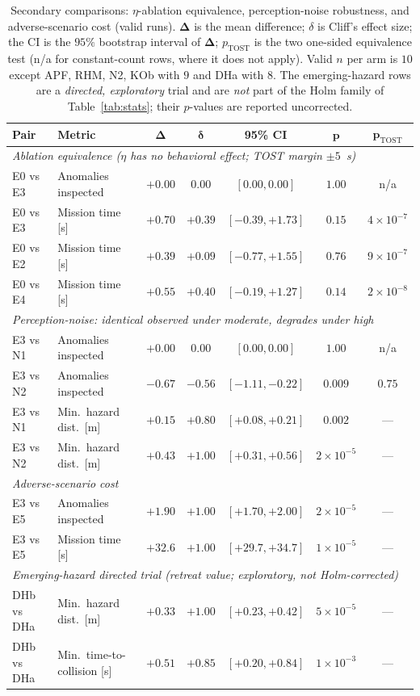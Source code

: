\begin{table}[t]
\centering
\caption{Secondary comparisons: $\eta$-ablation equivalence, perception-noise
robustness, and adverse-scenario cost (valid runs). $\bm{\Delta}$ is the mean
difference; $\delta$ is Cliff's effect size; the CI is the $95\%$ bootstrap
interval of $\bm{\Delta}$; $p_{\mathrm{TOST}}$ is the two one-sided equivalence test
(n/a for constant-count rows, where it does not apply). Valid $n$ per arm is $10$
except APF, RHM, N2, KOb with $9$ and DHa with $8$. The emerging-hazard rows are a
\emph{directed, exploratory} trial and are \emph{not} part of the Holm family of
Table~\ref{tab:stats}; their $p$-values are reported uncorrected.}
\label{tab:allstats}
\footnotesize
\setlength{\tabcolsep}{10pt}
\begin{tabular}{llccccc}
\hline
\textbf{Pair} & \textbf{Metric} & $\bm{\Delta}$ & $\bm{\delta}$ & \textbf{95\% CI} & $\bm{p}$ & $\bm{p_{\mathrm{TOST}}}$\\
\hline
\multicolumn{7}{l}{\emph{Ablation equivalence ($\eta$ has no behavioral effect; TOST margin $\pm5$~s)}}\\
E0 vs E3 & Anomalies inspected & $+0.00$ & $0.00$ & $[0.00,0.00]$ & $1.00$ & n/a\\
E0 vs E3 & Mission time [s] & $+0.70$ & $+0.39$ & $[-0.39,+1.73]$ & $0.15$ & $4{\times}10^{-7}$\\
E0 vs E2 & Mission time [s] & $+0.39$ & $+0.09$ & $[-0.77,+1.55]$ & $0.76$ & $9{\times}10^{-7}$\\
E0 vs E4 & Mission time [s] & $+0.55$ & $+0.40$ & $[-0.19,+1.27]$ & $0.14$ & $2{\times}10^{-8}$\\
\hline
\multicolumn{7}{l}{\emph{Perception-noise: identical observed under moderate, degrades under high}}\\
E3 vs N1 & Anomalies inspected & $+0.00$ & $0.00$ & $[0.00,0.00]$ & $1.00$ & n/a\\
E3 vs N2 & Anomalies inspected & $-0.67$ & $-0.56$ & $[-1.11,-0.22]$ & $0.009$ & $0.75$\\
E3 vs N1 & Min.\ hazard dist.\ [m] & $+0.15$ & $+0.80$ & $[+0.08,+0.21]$ & $0.002$ & ---\\
E3 vs N2 & Min.\ hazard dist.\ [m] & $+0.43$ & $+1.00$ & $[+0.31,+0.56]$ & $2{\times}10^{-5}$ & ---\\
\hline
\multicolumn{7}{l}{\emph{Adverse-scenario cost}}\\
E3 vs E5 & Anomalies inspected & $+1.90$ & $+1.00$ & $[+1.70,+2.00]$ & $2{\times}10^{-5}$ & ---\\
E3 vs E5 & Mission time [s] & $+32.6$ & $+1.00$ & $[+29.7,+34.7]$ & $1{\times}10^{-5}$ & ---\\
\hline
\multicolumn{7}{l}{\emph{Emerging-hazard directed trial (retreat value; exploratory, not Holm-corrected)}}\\
DHb vs DHa & Min.\ hazard dist.\ [m] & $+0.33$ & $+1.00$ & $[+0.23,+0.42]$ & $5{\times}10^{-5}$ & ---\\
DHb vs DHa & Min.\ time-to-collision [s] & $+0.51$ & $+0.85$ & $[+0.20,+0.84]$ & $1{\times}10^{-3}$ & ---\\
\hline
\end{tabular}
\end{table}


